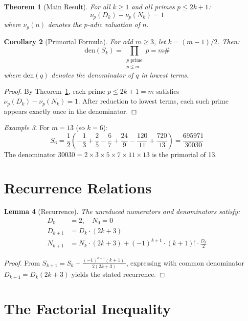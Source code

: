 \documentclass[11pt]{article}
\newtheorem{theorem}{Theorem}
\newtheorem{lemma}[theorem]{Lemma}
\newtheorem{corollary}[theorem]{Corollary}
\theoremstyle{definition}
\theoremstyle{remark}
\newtheorem{example}[theorem]{Example}
\begin{document}
\begin{theorem}[Main Result]\label{thm:main}
For all $k \geq 1$ and all primes $p \leq 2k+1$:
\[
\nu_p(D_k) - \nu_p(N_k) = 1
\]
where $\nu_p(n)$ denotes the $p$-adic valuation of $n$.
\end{theorem}

\begin{corollary}[Primorial Formula]
For odd $m \geq 3$, let $k = (m-1)/2$. Then:
\[
\mathrm{den}(S_k) = \prod_{\substack{p \text{ prime} \\ p \leq m}} p = m\#
\]
where $\mathrm{den}(q)$ denotes the denominator of $q$ in lowest terms.
\end{corollary}

\begin{proof}
By Theorem~\ref{thm:main}, each prime $p \leq 2k+1 = m$ satisfies
$\nu_p(D_k) - \nu_p(N_k) = 1$. After reduction to lowest terms, each such
prime appears exactly once in the denominator.
\end{proof}

\begin{example}
For $m = 13$ (so $k = 6$):
\[
S_6 = \frac{1}{2}\left(-\frac{1}{3} + \frac{2}{5} - \frac{6}{7} + \frac{24}{9} - \frac{120}{11} + \frac{720}{13}\right) = \frac{695971}{30030}
\]
The denominator $30030 = 2 \times 3 \times 5 \times 7 \times 11 \times 13$ is the primorial of 13.
\end{example}

\section{Recurrence Relations}

\begin{lemma}[Recurrence]\label{lem:recurrence}
The unreduced numerators and denominators satisfy:
\begin{align}
D_0 &= 2, \quad N_0 = 0 \\
D_{k+1} &= D_k \cdot (2k+3) \\
N_{k+1} &= N_k \cdot (2k+3) + (-1)^{k+1} \cdot (k+1)! \cdot \frac{D_k}{2}
\end{align}
\end{lemma}

\begin{proof}
From $S_{k+1} = S_k + \frac{(-1)^{k+1}(k+1)!}{2(2k+3)}$, expressing with common
denominator $D_{k+1} = D_k(2k+3)$ yields the stated recurrence.
\end{proof}

\section{The Factorial Inequality}
\end{document}
